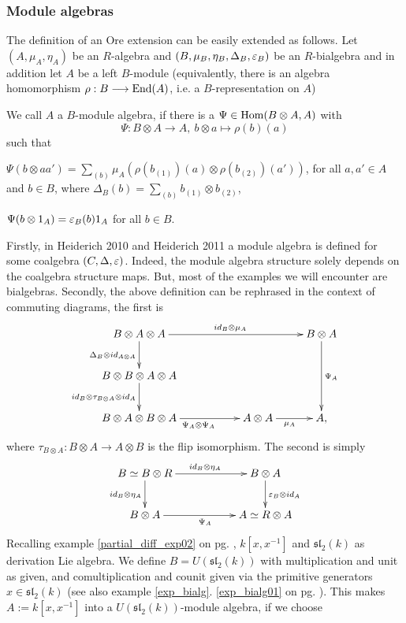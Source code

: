 \subsubsection{Module algebras}
The definition of an Ore extension can be easily extended as follows. Let $(A,\mu_A,\eta_A)$ be an $R$-algebra and $(B,\mu_B,\eta_B,\Delta_B,\varepsilon_B)$ be an $R$-bialgebra and in addition let $A$ be a left $B$-module (equivalently, there is an algebra homomorphism $\rho : B \longrightarrow \mathrm{End}(A)$, i.e. a $B$-representation on $A$)
\begin{defi}\label{defi09a}
We call $A$ a $B$-module algebra, if there is a $\Psi \in \mathrm{Hom}(B \otimes A, A)$ with
$$\Psi : B \otimes A \longrightarrow A,\ b \otimes a \longmapsto \rho(b)(a)$$
such that
\bn
\item $\Psi(b \otimes a a') = \sum_{(b)} \mu_A\left(\rho(b_{(1)})(a) \otimes \rho(b_{(2)})(a')\right)$, for all $a, a' \in A$ and $b \in B$,
where $\Delta_B(b) = \sum_{(b)} b_{(1)} \otimes b_{(2)}$,
\item $\Psi(b \otimes 1_A) = \varepsilon_B(b) 1_A$ for all $b \in B$.
\en
{}
\end{defi}
\bmk Firstly, in Heiderich 2010 and Heiderich 2011 a module algebra is defined for some coalgebra $(C,\Delta,\varepsilon)$. Indeed, the module algebra structure solely depends on the coalgebra structure maps. But, most of the examples we will encounter are bialgebras. Secondly, the above definition can be rephrased in the context of commuting diagrams, the first is
$$\xymatrix{
B \otimes A \otimes A \ar[d]_{\Delta_B\otimes id_{A\otimes A}}\ar[rrr]^{id_B\otimes \mu_A}&&& B\otimes A\ar[dd]^{\Psi_A}\\
B \otimes B \otimes A \otimes A \ar[d]_{id_B \otimes \tau_{B\otimes A} \otimes id_A}&&&\\
B\otimes A \otimes B \otimes A\ar[rr]_{\Psi_A\otimes \Psi_A}&&A \otimes A\ar[r]_{\mu_A}&A,\\
}$$
where $\tau_{B\otimes A} : B \otimes A \longrightarrow A \otimes B$ is the flip isomorphism. The second is simply
$$\xymatrix{
B \simeq B \otimes R \ar[rr]^{id_B \otimes \eta_A}\ar[d]_{id_B\otimes \eta_A}&&B \otimes A\ar[d]^{\eps_B \otimes id_A}\\
B \otimes A \ar[rr]_{\Psi_A}&& A \simeq R \otimes A\\
}$$
\bsp Recalling example \ref{partial_diff_exp02} on pg. \pageref{partial_diff_alg_examp}, $k[x,x^{-1}]$ and $\mathfrak{sl}_2(k)$ as derivation Lie algebra. We define $B = U(\mathfrak{sl}_2(k))$ with multiplication and unit as given, and comultiplication and counit given via the primitive generators $x \in \mathfrak{sl}_2(k)$ (see also example \ref{exp_bialg}. \ref{exp_bialg01} on pg. \pageref{exp_bialg01}). This makes $A := k[x,x^{-1}]$ into a $U(\mathfrak{sl}_2(k))$-module algebra, if we choose
